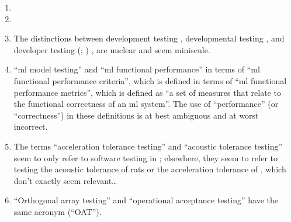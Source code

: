 \begin{enumerate}
    \item %
          \tourDiscrep{}
    \item %
          \alphaDiscrep{}
    \item %
          The distinctions between development testing \citep[p.~136]{IEEE2017},
          developmental testing \citep[p.~30]{Firesmith2015}, and developer
          testing
          \ifnotpaper
              (\citealp[p.~39]{Firesmith2015}; \citealp[p.~11]{Gerrard2000a})
          \else
              \cite[p.~39]{Firesmith2015}, \cite[p.~11]{Gerrard2000a}
          \fi are unclear and seem miniscule.
    \item %
           \citetISTQB{} 
          ``\acf{ml} model testing'' and ``\acs{ml} functional performance''
          in terms of ``\acs{ml} functional performance criteria'',
          which is defined in terms of ``\acs{ml} functional performance
          metrics'', which is defined as ``a set of measures that relate to the
          functional correctness of an \acs{ml} system''. The use
          of ``performance'' (or ``correctness'') in these definitions is at
          best ambiguous and at worst incorrect.
    \item %
          The terms ``acceleration tolerance testing'' and ``acoustic tolerance
          testing'' seem to only refer to software testing in
          \citep[p.~56]{Firesmith2015};
          elsewhere, they seem to refer to testing the acoustic tolerance of
          rats \citep{HolleyEtAl1996} or the acceleration tolerance of
          \accelTolTest{}, which don't exactly seem relevant\dots%
    \item %
          ``Orthogonal array testing'' \ifnotpaper \citetext{%
                  \citealp[pp.~5-1,~5-11]{SWEBOK2024};
                  implied by \citealp[pp.~467,~473]{Valcheva2013};
                  \citealp[pp.~1573-1577,~1580]{YuEtAl2011}} \else
              \cite[pp.~5-1,~5-11]{SWEBOK2024} \fi and ``operational
          acceptance testing'' \citep[p.~30]{Firesmith2015} have the same
          acronym (``OAT'').


\end{enumerate}
